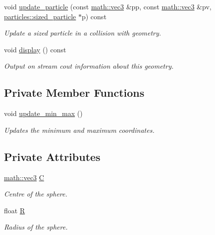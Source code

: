 \begin{DoxyCompactItemize}
void \hyperlink{classphysim_1_1geometry_1_1sphere_a68ebd59275ca9d6621fe94cd0cd3a502}{update\+\_\+particle} (const \hyperlink{structphysim_1_1math_1_1vec3}{math\+::vec3} \&pp, const \hyperlink{structphysim_1_1math_1_1vec3}{math\+::vec3} \&pv, \hyperlink{classphysim_1_1particles_1_1sized__particle}{particles\+::sized\+\_\+particle} $\ast$p) const
\begin{DoxyCompactList}\small\item\em Update a sized particle in a collision with geometry. \end{DoxyCompactList}\item 
\mbox{\label{classphysim_1_1geometry_1_1sphere_a83aacb43a18cbd98aa8f33cd017535a9}} 
void \hyperlink{classphysim_1_1geometry_1_1sphere_a83aacb43a18cbd98aa8f33cd017535a9}{display} () const
\begin{DoxyCompactList}\small\item\em Output on stream {\itshape cout} information about this geometry. \end{DoxyCompactList}\end{DoxyCompactItemize}
\subsection*{Private Member Functions}
\begin{DoxyCompactItemize}
\item 
void \hyperlink{classphysim_1_1geometry_1_1sphere_a91fbdd869e305fa7497d71fa9c148039}{update\+\_\+min\+\_\+max} ()
\begin{DoxyCompactList}\small\item\em Updates the minimum and maximum coordinates. \end{DoxyCompactList}\end{DoxyCompactItemize}
\subsection*{Private Attributes}
\begin{DoxyCompactItemize}
\item 
\mbox{\label{classphysim_1_1geometry_1_1sphere_a89191b7f06a7adde701deef52dde9383}} 
\hyperlink{structphysim_1_1math_1_1vec3}{math\+::vec3} \hyperlink{classphysim_1_1geometry_1_1sphere_a89191b7f06a7adde701deef52dde9383}{C}
\begin{DoxyCompactList}\small\item\em Centre of the sphere. \end{DoxyCompactList}\item 
\mbox{\label{classphysim_1_1geometry_1_1sphere_ab2969083a2ce2fdc86229b20a51600a4}} 
float \hyperlink{classphysim_1_1geometry_1_1sphere_ab2969083a2ce2fdc86229b20a51600a4}{R}
\begin{DoxyCompactList}\small\item\em Radius of the sphere. \end{DoxyCompactList}\end{DoxyCompactItemize}

